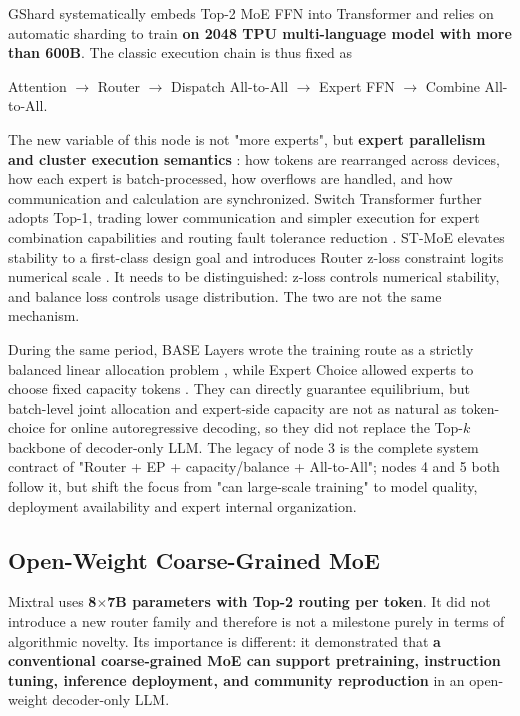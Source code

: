 \documentclass[10pt,a4paper,fontset=none]{ctexart}
\newcommand{\term}[1]{\textbf{#1}}
\begin{document}
GShard systematically embeds Top-2 MoE FFN into Transformer and relies on automatic sharding to train \textbf{ on \textbf{2048 TPU} multi-language model \cite{en:lepikhin2020gshard} with more than 600B}. The classic execution chain is thus fixed as
\begin{center}
\textsf{Attention $\rightarrow$ Router $\rightarrow$ Dispatch All-to-All $\rightarrow$ Expert FFN $\rightarrow$ Combine All-to-All}.
\end{center}
The new variable of this node is not "more experts", but \term{expert parallelism and cluster execution semantics }: how tokens are rearranged across devices, how each expert is batch-processed, how overflows are handled, and how communication and calculation are synchronized. Switch Transformer further adopts Top-1, trading lower communication and simpler execution for expert combination capabilities and routing fault tolerance reduction \cite{en:fedus2021switch}. ST-MoE elevates stability to a first-class design goal and introduces Router z-loss constraint logits numerical scale \cite{en:zoph2022stmoe}. It needs to be distinguished: z-loss controls numerical stability, and balance loss controls usage distribution. The two are not the same mechanism.

During the same period, BASE Layers wrote the training route as a strictly balanced linear allocation problem \cite{en:lewis2021base}, while Expert Choice allowed experts to choose fixed capacity tokens \cite{en:zhou2022expertchoice}. They can directly guarantee equilibrium, but batch-level joint allocation and expert-side capacity are not as natural as token-choice for online autoregressive decoding, so they did not replace the Top-$k$ backbone of decoder-only LLM. The legacy of node 3 is the complete system contract of "Router + EP + capacity/balance + All-to-All"; nodes 4 and 5 both follow it, but shift the focus from "can large-scale training" to model quality, deployment availability and expert internal organization.

\subsection{Open-Weight Coarse-Grained MoE}

Mixtral uses \textbf{8$\times$7B parameters with Top-2 routing per token}\cite{en:jiang2024mixtral}. It did not introduce a new router family and therefore is not a milestone purely in terms of algorithmic novelty. Its importance is different: it demonstrated that \term{a conventional coarse-grained MoE can support pretraining, instruction tuning, inference deployment, and community reproduction} in an open-weight decoder-only LLM.
\end{document}
